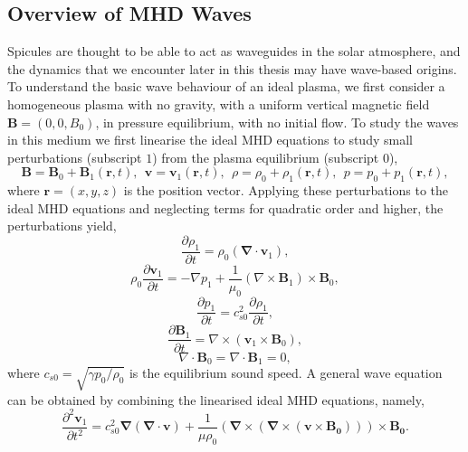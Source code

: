 \documentclass[12pt]{ociamthesis}
\newcommand{\bs}[1]{\boldsymbol{#1}}
\newcommand{\bn}{\boldsymbol{\nabla}}
\begin{document}
\subsection{Overview of MHD Waves}
\label{section:mhd_Waves}
Spicules are thought to be able to act as waveguides in the solar atmosphere, and the dynamics that we encounter later in this thesis may have wave-based origins. To understand the basic wave behaviour of an ideal plasma, we first consider a homogeneous plasma with no gravity, with a uniform vertical magnetic field $\bs{B}=(0,0,B_0)$, in pressure equilibrium, with no initial flow. To study the waves in this medium we first linearise the ideal MHD equations to study small perturbations (subscript $1$) from the plasma equilibrium (subscript $0$),
\begin{equation} \label{eq91}
\boldsymbol{B} = \boldsymbol{B}_0 + \boldsymbol{B}_1 (\boldsymbol{r},t) , \ \ \boldsymbol{v} = \boldsymbol{v}_1 (\boldsymbol{r}, t) , \ \ \rho = \rho_0 + \rho_1 ( \boldsymbol{r},t) , \ \ p = p_0 + p_1 ( \boldsymbol{r}, t) ,
\end{equation}
where $\bs{r} = (x,y,z)$ is the position vector. Applying these perturbations to the ideal MHD equations and neglecting terms for quadratic order and higher, the perturbations yield,
\begin{equation}\label{mhd_lin1}
\frac{\partial \rho_1}{\partial t} = \rho_0 ( \bn \cdot \boldsymbol{v}_1),
\end{equation}
\begin{equation}
\rho_0 \frac{\partial \boldsymbol{v}_1}{\partial t}  = - \nabla p_1 + \frac{1}{\mu_0} (\nabla \times \boldsymbol{B}_1) \times \boldsymbol{B}_0,
\end{equation}
\begin{equation}
\frac{\partial p_1}{\partial t} = c^2_{s0}  \frac{\partial \rho_1}{ \partial t},
\end{equation}
\begin{equation}
\frac{\partial \boldsymbol{B}_1}{\partial t} = \nabla \times (\boldsymbol{v}_1 \times \boldsymbol{B}_0),
\end{equation}
\begin{equation}\label{mhd_lin2}
\nabla \cdot \boldsymbol{B}_0 = \nabla \cdot \boldsymbol{B}_1 = 0 ,
\end{equation}
where $c_{s0} = \sqrt{\gamma p_0/ \rho_0}$ is the equilibrium sound speed. A general wave equation can be obtained by combining the linearised ideal MHD equations, namely,
\begin{equation}\label{wave_eq}
    \frac{\partial^2 \bs{v}_1}{\partial t^2} = c_{s0}^2 \bn (\bn \cdot \bs{v}) + \frac{1}{\mu \rho_0} (\bn \times (\bn \times (\bs{v}\times\bs{B_0}))) \times \bs{B_0}.
\end{equation}
\end{document}
